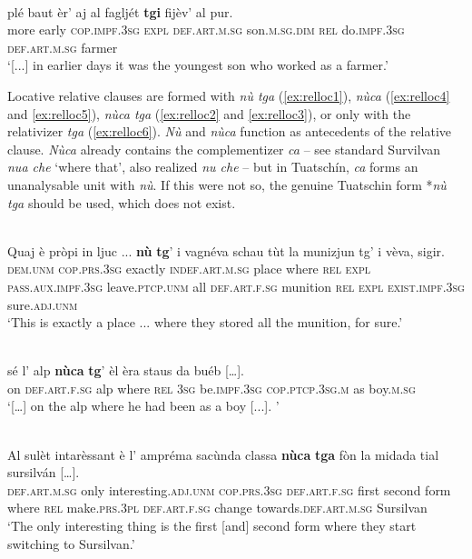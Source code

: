 \ea
\label{}
\\
\gll  [...] plé baut èr’ aj al fagljét \textbf{tgi} fijèv’ al pur. \\
{} more early \textsc{cop.impf.3sg} \textsc{expl} \textsc{def.art.m.sg}  son.\textsc{m.sg.dim} \textsc{rel} do.\textsc{impf.3sg} \textsc{def.art.m.sg} farmer \\
\glt `[...] in earlier days it was the youngest son who worked as a farmer.'
\z

Locative relative clauses are formed with \textit{nù tga} (\ref{ex:relloc1}), \textit{nùca} (\ref{ex:relloc4} and \ref{ex:relloc5}), \textit{nùca tga} (\ref{ex:relloc2} and \ref{ex:relloc3}), or only with the relativizer \textit{tga} (\ref{ex:relloc6}). \textit{Nù} and \textit{nùca} function as antecedents of the relative clause. \textit{Nùca} already contains the complementizer \textit{ca} –  see standard Survilvan \textit{nua che} ‘where that’, also realized \textit{nu che} – but in Tuatschín, \textit{ca} forms an unanalysable unit with \textit{nù}. If this were not so, the genuine Tuatschin form *\textit{nù tga} should be used, which does not exist.

\ea
\label{ex:relloc1}
\\
\gll  Quaj è pròpi in ljuc ... \textbf{nù} \textbf{tg}’ i vagnéva schau tùt la munizjun tg’ i vèva, sigir.\\
\textsc{dem.unm} \textsc{cop.prs.3sg} exactly \textsc{indef.art.m.sg} place {} where \textsc{rel} \textsc{expl} \textsc{pass.aux.impf.3sg} leave.\textsc{ptcp.unm} all \textsc{def.art.f.sg} munition \textsc{rel} \textsc{expl} \textsc{exist.impf.3sg} sure.\textsc{adj.unm}\\
\glt `This is exactly a place ... where they stored all the munition, for sure.'
\z

\ea
\label{ex:relloc2}
\\
\gll   […] sé l’ alp \textbf{nùca} \textbf{tg}’ èl èra staus da buéb […]. \\
     {}  on \textsc{def.art.f.sg} alp where \textsc{rel} \textsc{3sg} be.\textsc{impf.3sg} \textsc{cop.ptcp.3sg.m} as boy.\textsc{m.sg} \\
\glt `[…] on the alp where he had been as a boy [...]. '
\z

\ea
\label{ex:relloc3}
\\
\gll    Al sulèt intarèssant è l’ ampréma sacùnda classa \textbf{nùca} \textbf{tga} fòn la midada tial sursilván […].\\
\textsc{def.art.m.sg} only interesting.\textsc{adj.unm} \textsc{cop.prs.3sg} \textsc{def.art.f.sg} first second form where \textsc{rel} make.\textsc{prs.3pl} \textsc{def.art.f.sg} change towards.\textsc{def.art.m.sg} Sursilvan\\
\glt `The only interesting thing is the first [and] second form where they start switching to Sursilvan.'
\z

